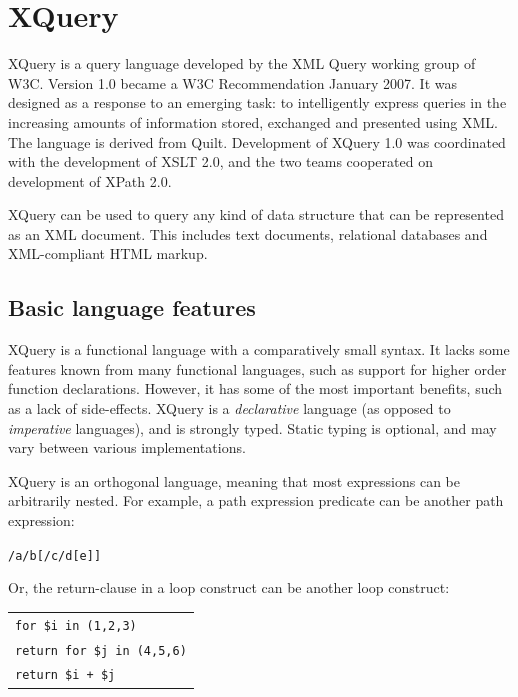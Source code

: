 \section{XQuery}
\label{sect:theory:xquery}

XQuery is a query language developed by the XML Query working group of W3C.
Version 1.0\cite{w3c00} became a W3C Recommendation January 2007. It was
designed as a response to an emerging task: to intelligently express queries in
the increasing amounts of information stored, exchanged and presented using
XML. The language is derived from Quilt\cite{quilt_queryLanguage}. Development
of XQuery 1.0 was coordinated with the development of XSLT 2.0, and the two
teams cooperated on development of XPath 2.0.

XQuery can be used to query any kind of data structure that can be represented
as an XML document. This includes text documents, relational databases and XML-compliant HTML markup.

\subsection{Basic language features}
\label{sect:theory:xquery:basics}
XQuery is a functional language with a comparatively small syntax. It lacks
some features known from many functional languages, such as support for higher
order function declarations. However, it has some of the most important benefits, such as a lack of side-effects. XQuery is a
\textit{declarative} language (as opposed to \textit{imperative} languages), and
is strongly typed. Static typing is optional, and may vary between various
implementations.


XQuery is an orthogonal language, meaning that most expressions can be
arbitrarily nested. For example, a path expression predicate can be another
path expression:
\begin{center}
\texttt{/a/b[/c/d[e]]}
\end{center}
Or, the return-clause in a loop construct can be another loop
construct:
\begin{center}
\begin{tabular}{l}
\texttt{for \$i in (1,2,3) } \\ \quad 
\texttt{return for \$j in (4,5,6)} \\ \quad\quad 
\texttt{return \$i + \$j}
\end{tabular}
\end{center}

